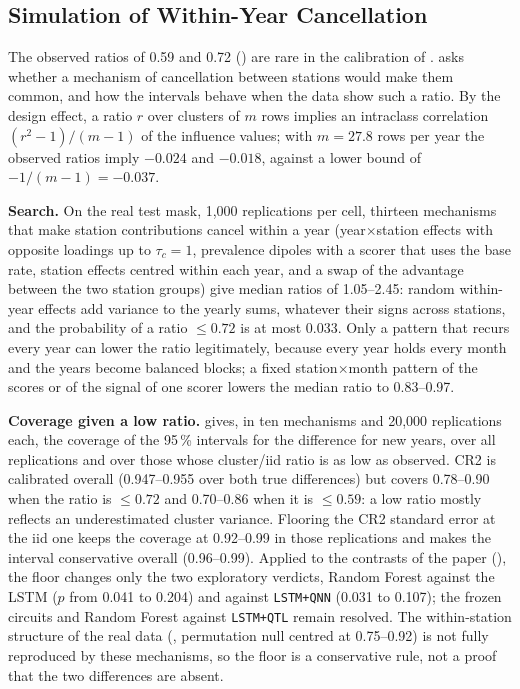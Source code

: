 \documentclass[11pt,a4paper]{article}
\begin{document}
\subsection{Simulation of Within-Year Cancellation}
\label{app:cancellation_sim}

The observed ratios of 0.59 and 0.72 () are rare in the calibration of .  asks whether a mechanism of cancellation between stations would make them common, and how the intervals behave when the data show such a ratio. By the design effect, a ratio $r$ over clusters of $m$ rows implies an intraclass correlation $(r^2-1)/(m-1)$ of the influence values; with $m=27.8$ rows per year the observed ratios imply $-0.024$ and $-0.018$, against a lower bound of $-1/(m-1)=-0.037$.

\textbf{Search.} On the real test mask, 1{,}000 replications per cell, thirteen mechanisms that make station contributions cancel within a year (year$\times$station effects with opposite loadings up to $\tau_c=1$, prevalence dipoles with a scorer that uses the base rate, station effects centred within each year, and a swap of the advantage between the two station groups) give median ratios of 1.05--2.45: random within-year effects add variance to the yearly sums, whatever their signs across stations, and the probability of a ratio $\le0.72$ is at most 0.033. Only a pattern that recurs every year can lower the ratio legitimately, because every year holds every month and the years become balanced blocks; a fixed station$\times$month pattern of the scores or of the signal of one scorer lowers the median ratio to 0.83--0.97.

\textbf{Coverage given a low ratio.}  gives, in ten mechanisms and 20{,}000 replications each, the coverage of the 95\,\% intervals for the difference for new years, over all replications and over those whose cluster/iid ratio is as low as observed. CR2 is calibrated overall (0.947--0.955 over both true differences) but covers 0.78--0.90 when the ratio is $\le0.72$ and 0.70--0.86 when it is $\le0.59$: a low ratio mostly reflects an underestimated cluster variance. Flooring the CR2 standard error at the iid one keeps the coverage at 0.92--0.99 in those replications and makes the interval conservative overall (0.96--0.99). Applied to the contrasts of the paper (), the floor changes only the two exploratory verdicts, Random Forest against the LSTM ($p$ from 0.041 to 0.204) and against \texttt{LSTM+QNN} (0.031 to 0.107); the frozen circuits and Random Forest against \texttt{LSTM+QTL} remain resolved. The within-station structure of the real data (, permutation null centred at 0.75--0.92) is not fully reproduced by these mechanisms, so the floor is a conservative rule, not a proof that the two differences are absent.
\end{document}
